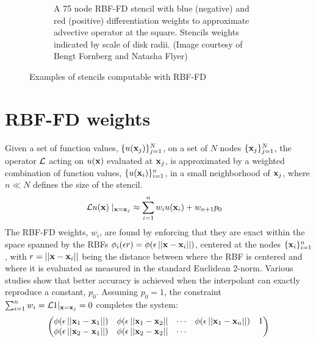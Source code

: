 \documentclass{report}
\begin{document}
{\begin{figure}[htbp]
\begin{subfigure}[m]{0.35\textwidth}
		\caption{A 75 node RBF-FD stencil with blue (negative) and red (positive) differentiation weights to approximate advective operator at the square. Stencils weights indicated by scale of disk radii. (Image courtesy of Bengt Fornberg and Natasha Flyer)}
		\label{fig:stencil_example_sphere}
	\end{subfigure}
	\caption{Examples of stencils computable with RBF-FD }
	\label{fig:stencil_example}
\end{figure}


\section{RBF-FD weights}
\label{sec:rbffd}

Given a set of function values, $\{u(\mathbf{x}_j)\}_{j=1}^{N}$, on a set of $N$ nodes $\{\mathbf{x}_j\}_{j=1}^{N}$, the operator $\diffop$ acting on $u(\mathbf{x})$ evaluated at 
$\mathbf{x}_j$, %
is approximated by a weighted combination of function values, $\{u(\mathbf{x}_i)\}_{i=1}^{n}$, in a small neighborhood of $\mathbf{x}_j$, 
where $n\ll N$ defines the size of the stencil. 
\begin{align}
\mathcal{L}u(\mathbf{x})\mid_{\mathbf{x}=\mathbf{x}_j} &\approx \sum_{i=1}^{n} w_i u(\mathbf{x}_i) + w_{n+1} p_0
\label{eq:derivFromFDWeights}
\end{align}
The RBF-FD weights, ${w_i}$, are found by enforcing that they are exact within the space spanned by the RBFs $\phi_i(\epsilon r) = \phi(\epsilon\left|\left|\mathbf{x}-\mathbf{x}_{i}\right|\right|)$, centered at the nodes $\{\mathbf{x}_i\}_{i=1}^{n}$, with 
$r=\left|\left|\mathbf{x} - \mathbf{x}_i\right|\right|$
being the distance between where the RBF is centered and where it is evaluated as measured in the standard Euclidean 2-norm. Various studies show  \cite{WrightFornberg06,FornbergDriscoll02,FornbergLehto11,FlyerLehto11} that better accuracy is achieved when the 
interpolant can exactly reproduce a constant, $p_0$.  
Assuming $p_0 = 1$, the constraint $\sum_{i=1}^{n}w_i=\mathcal{L}1|_{\mathbf{x}=\mathbf{x}_{j}}=0$ completes the system: 
\begin{align}
\begin{pmatrix}
\phi(\epsilon\left|\left|\mathbf{x}_1-\mathbf{x}_1\right|\right|) & \phi(\epsilon\left|\left|\mathbf{x}_1-\mathbf{x}_2\right|\right| & \cdots & \phi(\epsilon\left|\left|\mathbf{x}_1-\mathbf{x}_n\right|\right|) & 1 \\
\phi(\epsilon\left|\left|\mathbf{x}_2-\mathbf{x}_1\right|\right|) & \phi(\epsilon\left|\left|\mathbf{x}_2-\mathbf{x}_2\right|\right| & \cdots &

\end{pmatrix}
\end{align}}
\end{document}
